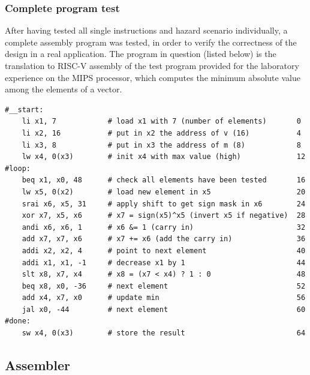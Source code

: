 \documentclass[a4paper]{article}
\begin{document}
\subsubsection{Complete program test}
After having tested all single instructions and hazard scenario individually, a complete assembly program was tested, in order to verify the correctness of the design in a real application. The program in question (listed below) is the translation to RISC-V assembly of the test program provided for the laboratory experience on the MIPS processor, which computes the minimum absolute value among the elements of a vector.
\begin{verbatim}
#__start:
    li x1, 7            # load x1 with 7 (number of elements)       0
    li x2, 16           # put in x2 the address of v (16)           4
    li x3, 8            # put in x3 the address of m (8)            8
    lw x4, 0(x3)        # init x4 with max value (high)             12
#loop:
    beq x1, x0, 48      # check all elements have been tested       16
    lw x5, 0(x2)        # load new element in x5                    20
    srai x6, x5, 31     # apply shift to get sign mask in x6        24
    xor x7, x5, x6      # x7 = sign(x5)^x5 (invert x5 if negative)  28
    andi x6, x6, 1      # x6 &= 1 (carry in)                        32
    add x7, x7, x6      # x7 += x6 (add the carry in)               36
    addi x2, x2, 4      # point to next element                     40
    addi x1, x1, -1     # decrease x1 by 1                          44
    slt x8, x7, x4      # x8 = (x7 < x4) ? 1 : 0                    48
    beq x8, x0, -36     # next element                              52
    add x4, x7, x0      # update min                                56
    jal x0, -44         # next element                              60    
#done:
    sw x4, 0(x3)        # store the result                          64
\end{verbatim}



\subsection{Assembler}\label{sec:assembler}
\end{document}
